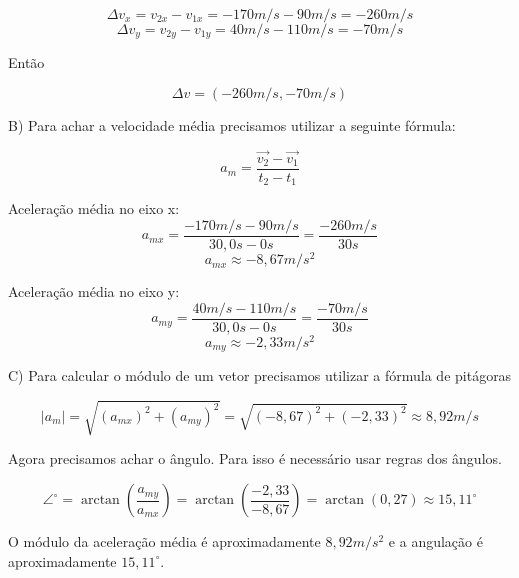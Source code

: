 \documentclass[a4paper, 12pt]{article}
\begin{document}
\begin{flushleft}
		\begin{equation*}
			\Delta{v_x} = v_{2x} - v_{1x} = -170m/s - 90m/s = -260m/s
		\end{equation*}
		\begin{equation*}
			\Delta{v_y} = v_{2y} - v_{1y} = 40m/s - 110m/s = -70m/s
		\end{equation*}
		
		Então
		
		\begin{equation*}
			\Delta{v} = (-260m/s , -70m/s)
		\end{equation*}
		
		B) Para achar a velocidade média precisamos utilizar a seguinte fórmula:
		
		\begin{equation*}
			a_m = \frac{\vec{v_2} - \vec{v_1}}{t_2 - t_1}
		\end{equation*}
		
		Aceleração média no eixo x:
		\begin{equation*}
			a_{mx} = \frac{-170 m/s - 90 m/s}{30,0 s - 0s} = \frac{-260m/s}{30s}
		\end{equation*}
		\begin{equation*}
			a_{mx} \approx - 8,67 m/s^2
		\end{equation*}
		
		Aceleração média no eixo y:
		\begin{equation*}
			a_{my} = \frac{40m/s - 110m/s}{30,0 s - 0s} = \frac{-70m/s}{30s}
		\end{equation*}
		\begin{equation*}
			a_{my} \approx - 2,33 m/s^2
		\end{equation*}
		
		C) Para calcular o módulo de um vetor precisamos utilizar a fórmula de pitágoras
		
		\begin{equation*}
			|a_m| = \sqrt{(a_{mx})^2 + (a_{my})^2} = \sqrt{(-8,67)^2 + (-2,33)^2} \approx 8,92 m/s
		\end{equation*}
		
		Agora precisamos achar o ângulo. Para isso é necessário usar regras dos ângulos.
		
		\begin{equation*}
			\angle^{\circ} = \arctan(\frac{a_{my}}{a_{mx}}) = \arctan (\frac{-2,33}{-8,67}) = \arctan (0,27) \approx 15,11^{\circ}  
		\end{equation*}
		
		O módulo da aceleração média é aproximadamente $8,92 m/s^2$ e a angulação é aproximadamente $15,11^{\circ}$.
		

\end{flushleft}
\end{document}
